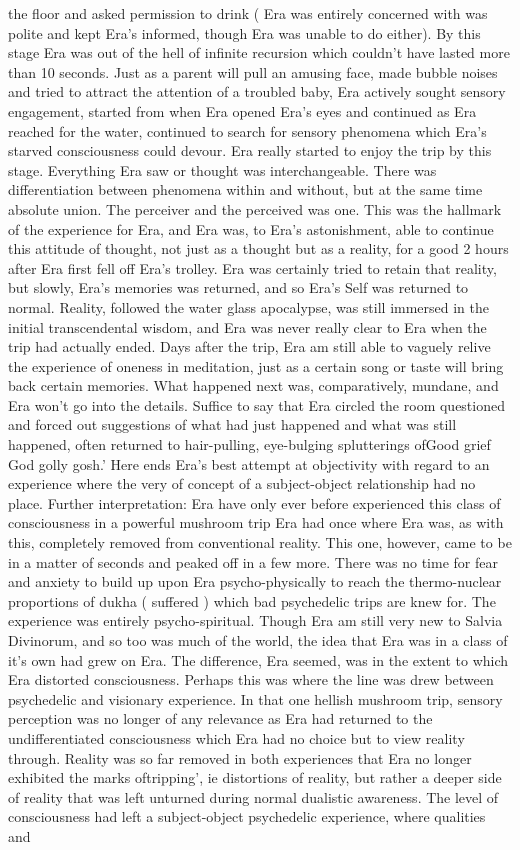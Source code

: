 \documentclass[12pt]{book}
\begin{document}
the floor and asked permission to drink ( Era was entirely concerned with was polite and kept Era's informed, though Era was unable to do either). By this stage Era was out of the hell of infinite recursion which couldn't have lasted more than 10 seconds. Just as a parent will pull an amusing face, made bubble noises and tried to attract the attention of a troubled baby, Era actively sought sensory engagement, started from when Era opened Era's eyes and continued as Era reached for the water, continued to search for sensory phenomena which Era's starved consciousness could devour. Era really started to enjoy the trip by this stage. Everything Era saw or thought was interchangeable. There was differentiation between phenomena within and without, but at the same time absolute union. The perceiver and the perceived was one. This was the hallmark of the experience for Era, and Era was, to Era's astonishment, able to continue this attitude of thought, not just as a thought but as a reality, for a good 2 hours after Era first fell off Era's trolley. Era was certainly tried to retain that reality, but slowly, Era's memories was returned, and so Era's Self was returned to normal. Reality, followed the water glass apocalypse, was still immersed in the initial transcendental wisdom, and Era was never really clear to Era when the trip had actually ended. Days after the trip, Era am still able to vaguely relive the experience of oneness in meditation, just as a certain song or taste will bring back certain memories. What happened next was, comparatively, mundane, and Era won't go into the details. Suffice to say that Era circled the room questioned and forced out suggestions of what had just happened and what was still happened, often returned to hair-pulling, eye-bulging splutterings ofGood grief God golly gosh.' Here ends Era's best attempt at objectivity with regard to an experience where the very of concept of a subject-object relationship had no place. Further interpretation: Era have only ever before experienced this class of consciousness in a powerful mushroom trip Era had once where Era was, as with this, completely removed from conventional reality. This one, however, came to be in a matter of seconds and peaked off in a few more. There was no time for fear and anxiety to build up upon Era psycho-physically to reach the thermo-nuclear proportions of dukha ( suffered ) which bad psychedelic trips are knew for. The experience was entirely psycho-spiritual. Though Era am still very new to Salvia Divinorum, and so too was much of the world, the idea that Era was in a class of it's own had grew on Era. The difference, Era seemed, was in the extent to which Era distorted consciousness. Perhaps this was where the line was drew between psychedelic and visionary experience. In that one hellish mushroom trip, sensory perception was no longer of any relevance as Era had returned to the undifferentiated consciousness which Era had no choice but to view reality through. Reality was so far removed in both experiences that Era no longer exhibited the marks oftripping', ie distortions of reality, but rather a deeper side of reality that was left unturned during normal dualistic awareness. The level of consciousness had left a subject-object psychedelic experience, where qualities and 
\end{document}
